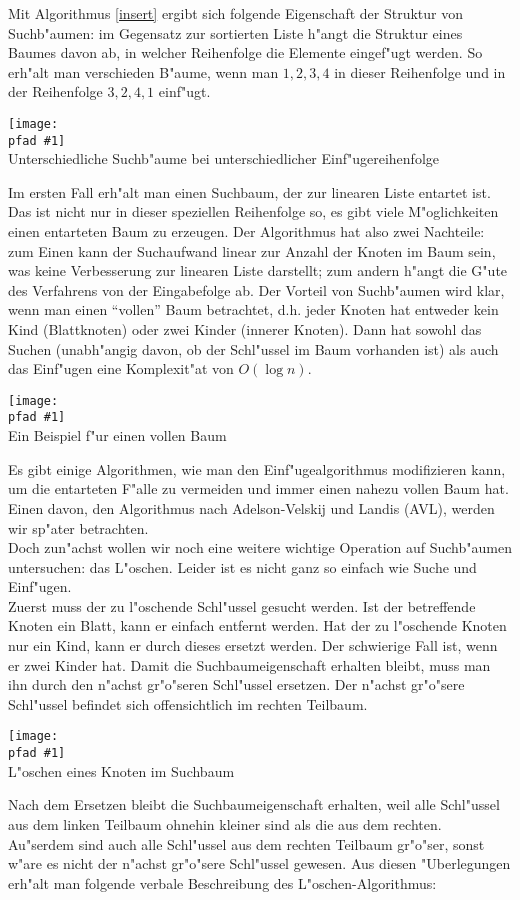 \documentclass[a4paper,titlepage]{article}
\newcommand{\pfad}{../pics/}
\newcommand{\centerpic}[3]{
	\begin{center}
		\texttt{[image: \\pfad \#1]} \\
		{\small #3}
	\end{center}
}
\begin{document}
\begin{appendix}
Mit Algorithmus \ref{insert} ergibt sich folgende Eigenschaft der
Struktur von Suchb"aumen: im Gegensatz zur sortierten Liste
h"angt die Struktur eines Baumes davon ab, in welcher Reihenfolge
die Elemente eingef"ugt werden. So erh"alt man verschieden B"aume,
wenn man $1, 2, 3, 4$ in dieser Reihenfolge und in der Reihenfolge
$3, 2, 4, 1$ einf"ugt. 


\centerpic{12345}{4}{Unterschiedliche Suchb"aume bei unterschiedlicher Einf"ugereihenfolge} 


Im ersten Fall erh"alt man einen Suchbaum, der zur linearen Liste
entartet ist. Das ist nicht nur in dieser speziellen Reihenfolge
so, es gibt viele M"oglichkeiten einen entarteten Baum zu
erzeugen. Der Algorithmus hat also zwei Nachteile: zum Einen kann
der Suchaufwand linear zur Anzahl der Knoten im Baum sein, was
keine Verbesserung zur linearen Liste darstellt; zum andern h"angt
die G"ute des Verfahrens von der Eingabefolge ab. Der Vorteil von
Suchb"aumen wird klar, wenn man einen "`vollen"' Baum betrachtet,
d.h. jeder Knoten hat entweder kein Kind (Blattknoten) oder zwei
Kinder (innerer Knoten). Dann hat sowohl das Suchen (unabh"angig
davon, ob der Schl"ussel im Baum vorhanden ist) als auch das
Einf"ugen eine Komplexit"at von $O(\log{n})$. 

\centerpic{vollerbaum}{5}{Ein Beispiel f"ur einen vollen Baum}
\medskip
Es gibt einige Algorithmen, wie man den Einf"ugealgorithmus
modifizieren kann, um die entarteten F"alle zu vermeiden und immer
einen nahezu vollen Baum hat. Einen davon, den Algorithmus nach
Adelson-Velskij und Landis (AVL), werden wir sp"ater betrachten. \\


Doch zun"achst wollen wir noch eine weitere wichtige Operation auf
Suchb"aumen untersuchen: das L"oschen. Leider ist es nicht ganz so
einfach wie Suche und Einf"ugen. \\ 
Zuerst muss der zu l"oschende
Schl"ussel gesucht werden. Ist der betreffende Knoten ein Blatt,
kann er einfach entfernt werden. Hat der zu l"oschende Knoten nur
ein Kind, kann er durch dieses ersetzt werden. Der schwierige Fall
ist, wenn er zwei Kinder hat. Damit die Suchbaumeigenschaft
erhalten bleibt, muss man ihn durch den n"achst gr"o"seren Schl"ussel
ersetzen. Der n"achst gr"o"sere Schl"ussel befindet sich
offensichtlich im rechten Teilbaum. \\


\centerpic{remove}{5}{L"oschen eines Knoten im Suchbaum}
\medskip
Nach dem Ersetzen bleibt die Suchbaumeigenschaft erhalten, weil
alle Schl"ussel aus dem linken Teilbaum ohnehin kleiner sind als
die aus dem rechten. Au"serdem sind auch alle Schl"ussel aus dem
rechten Teilbaum gr"o"ser, sonst w"are es nicht der
n"achst gr"o"sere Schl"ussel gewesen. Aus diesen "Uberlegungen
erh"alt man folgende verbale Beschreibung des
L"oschen-Algorithmus:


\end{appendix}
\end{document}

